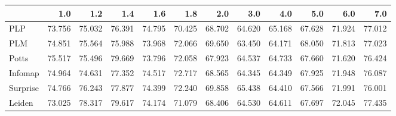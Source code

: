 \begin{tabular}{lrrrrrrrrrrr}
\toprule
{} &    1.0 &    1.2 &    1.4 &    1.6 &    1.8 &    2.0 &    3.0 &    4.0 &    5.0 &    6.0 &    7.0 \\
\midrule
PLP      & 73.756 & 75.032 & 76.391 & 74.795 & 70.425 & 68.702 & 64.620 & 65.168 & 67.628 & 71.924 & 77.012 \\
PLM      & 74.851 & 75.564 & 75.988 & 73.968 & 72.066 & 69.650 & 63.450 & 64.171 & 68.050 & 71.813 & 77.023 \\
Potts    & 75.517 & 75.496 & 79.669 & 73.796 & 72.058 & 67.923 & 64.537 & 64.733 & 67.660 & 71.620 & 76.424 \\
Infomap  & 74.964 & 74.631 & 77.352 & 74.517 & 72.717 & 68.565 & 64.345 & 64.349 & 67.925 & 71.948 & 76.087 \\
Surprise & 74.766 & 76.243 & 77.877 & 74.399 & 72.240 & 69.858 & 65.438 & 64.410 & 67.566 & 71.991 & 76.001 \\
Leiden   & 73.025 & 78.317 & 79.617 & 74.174 & 71.079 & 68.406 & 64.530 & 64.611 & 67.697 & 72.045 & 77.435 \\
\bottomrule
\end{tabular}

